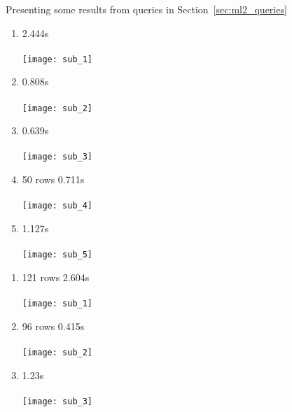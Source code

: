 Presenting some results from queries in Section~\ref{sec:ml2_queries}
\begin{enumerate}
    \item 2.444s\\ \\
      \texttt{[image: sub\_1]}
    \item 0.808s \\ \\
      \texttt{[image: sub\_2]}
    \item 0.639s \\ \\
      \texttt{[image: sub\_3]}
    \item 50 rows 0.711s\\ \\
      \texttt{[image: sub\_4]}
    \item 1.127s \\ \\
      \texttt{[image: sub\_5]}
\end{enumerate}
\begin{enumerate}
    \item 121 rows 2.604s \\ \\
      \texttt{[image: sub\_1]}
    \item 96 rows 0.415s \\ \\
      \texttt{[image: sub\_2]}
    \item 1.23s\\ \\
      \texttt{[image: sub\_3]}
\end{enumerate}

